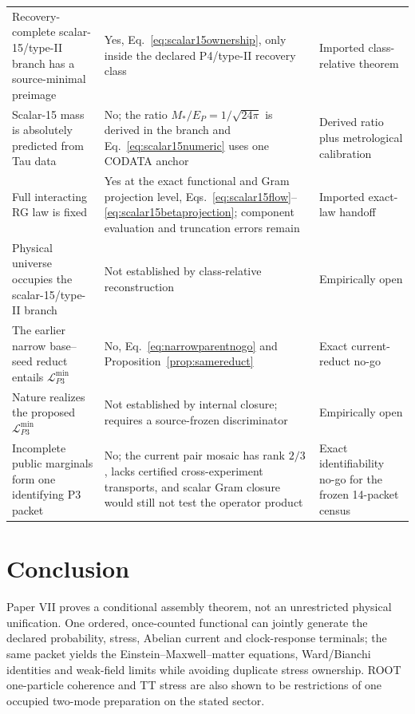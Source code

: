 \documentclass[11pt]{article}
\begin{document}
\begin{longtable}{@{}p{}p{}p{}@{}}
Recovery-complete scalar-15/type-II branch has a source-minimal preimage &
Yes, Eq.~\eqref{eq:scalar15ownership}, only inside the declared P4/type-II
recovery class & Imported class-relative theorem\\
Scalar-15 mass is absolutely predicted from Tau data & No; the ratio
\(M_*/E_P=1/\sqrt{24\pi}\) is derived in the branch and
Eq.~\eqref{eq:scalar15numeric} uses one CODATA anchor & Derived ratio plus
metrological calibration\\
Full interacting RG law is fixed & Yes at the exact functional and Gram
projection level, Eqs.~\eqref{eq:scalar15flow}--
\eqref{eq:scalar15betaprojection}; component evaluation and truncation errors
remain & Imported exact-law handoff\\
Physical universe occupies the scalar-15/type-II branch & Not established by
class-relative reconstruction & Empirically open\\
The earlier narrow base--seed reduct entails $\mathcal L_{P3}^{\min}$ & No,
Eq.~\eqref{eq:narrowparentnogo} and Proposition~\ref{prop:samereduct} & Exact
current-reduct no-go\\
Nature realizes the proposed $\mathcal L_{P3}^{\min}$ & Not established by
internal closure; requires a source-frozen discriminator & Empirically open\\
Incomplete public marginals form one identifying P3 packet & No; the current
pair mosaic has rank $2/3$, lacks certified cross-experiment transports, and
scalar Gram closure would still not test the operator product & Exact
identifiability no-go for the frozen 14-packet census\\
\bottomrule
\end{longtable}

\section{Conclusion}

Paper VII proves a conditional assembly theorem, not an unrestricted physical
unification.  One ordered, once-counted functional can jointly generate the
declared probability, stress, Abelian current and clock-response terminals;
the same packet yields the Einstein--Maxwell--matter equations, Ward/Bianchi
identities and weak-field limits while avoiding duplicate stress ownership.
ROOT one-particle coherence and TT stress are also shown to be restrictions of
one occupied two-mode preparation on the stated sector.
\end{document}
